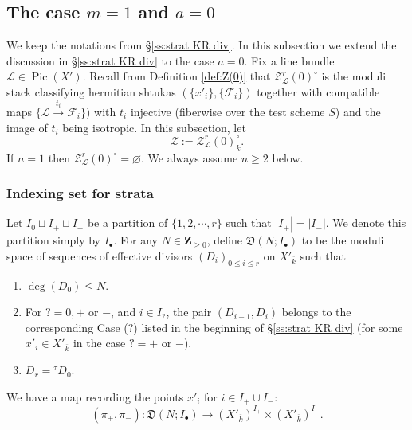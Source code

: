 \documentclass[reqno]{amsart}
\numberwithin{equation}{section}
\newcommand{\Z}{\mathbf{Z}}
\newcommand{\ol}[1]{\overline{#1}}
\DeclareMathOperator{\Pic}{Pic}
\newcommand{\bu}{\bullet}
\newcommand{\ov}{\overline}
\newcommand\xr{\xrightarrow}
\newcommand\vn{\varnothing}
\renewcommand{\t}{\tau}
\newcommand\cA{\mathcal{A}}
\newcommand\cF{\mathcal{F}}
\newcommand\cL{\mathcal{L}}
\newcommand\cZ{\mathcal{Z}}
\newcommand\frD{\mathfrak{D}}
\theoremstyle{remark}
\numberwithin{equation}{section}
\begin{document}

\subsection{The case $m=1$ and $a=0$}\label{ssec: m=1 a=0 case}
We keep the notations from \S\ref{ss:strat KR div}. In this subsection we extend the discussion in \S\ref{ss:strat KR div} to the case $a=0$. Fix a line bundle $\cL\in \Pic(X')$. Recall from Definition  \ref{def:Z(0)} that $\cZ_{\cL}^{r}(0)^{\circ}$ is the moduli stack classifying hermitian shtukas $(\{x'_{i}\},\{\cF_{i}\})$ together with compatible maps $\{\cL\xr{t_{i}}\cF_{i}\})$ with $t_{i}$ injective (fiberwise over the test scheme $S$) and the image of $t_{i}$ being isotropic.  In this subsection, let
\begin{equation}
\cZ:=\cZ_{\cL}^{r}(0)^{\circ}_{\ov k}.
\end{equation}
If $n=1$ then $\cZ_{\cL}^{r}(0)^{\circ}=\vn$. We always assume $n\ge2$ below. 

\subsubsection{Indexing set for strata} Let $I_{0}\sqcup I_{+}\sqcup I_{-}$ be a partition of $\{1,2,\cdots, r\}$ such that $|I_{+}|=|I_{-}|$.  We denote this partition simply by $I_{\bu}$. For any $N\in \Z_{\ge0}$, define $\frD(N;I_{\bu})$ to be the moduli space of sequences of effective divisors $(D_{i})_{0\le i\le r}$ on $X'_{\ov k}$ such that
\begin{enumerate}
\item $\deg(D_{0})\le N$.
\item For $?=0,+$ or $-$, and $i\in I_{?}$, the pair $(D_{i-1},D_{i})$ belongs to the corresponding Case (?) listed in the beginning of \S\ref{ss:strat KR div} (for some $x'_{i}\in X'_{\ov k}$ in the case $?=+$ or $-$).
\item $D_{r}={}^{\t}D_{0}$. 
\end{enumerate}
We have a map recording the points $x'_{i}$ for $i\in I_{+}\cup I_{-}$:
\begin{equation}
(\pi_{+}, \pi_{-}): \frD(N;I_{\bu})\to (X'_{\ol{k}})^{I_{+}}\times (X'_{\ol{k}})^{I_{-}}.
\end{equation}
\end{document}
